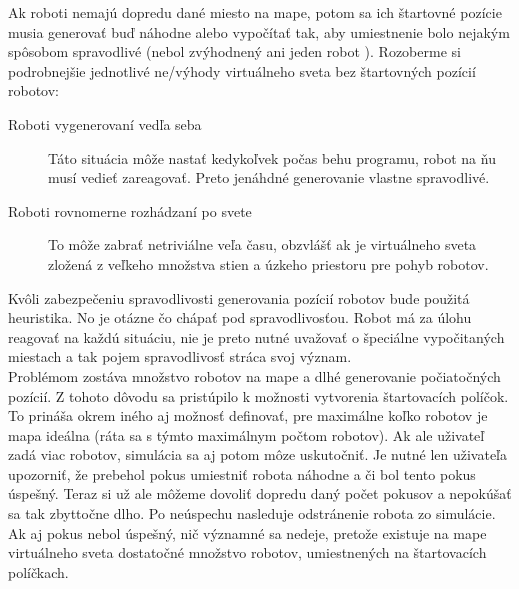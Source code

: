\begin{description}
\newline
Ak roboti nemajú dopredu dané miesto na mape, potom sa ich štartovné pozície musia generovať buď náhodne alebo vypočítať tak, aby umiestnenie bolo nejakým spôsobom spravodlivé (nebol zvýhodnený ani jeden robot ). Rozoberme si podrobnejšie jednotlivé ne/výhody virtuálneho sveta bez štartovných pozícií robotov:
\begin{description}
\item[Roboti vygenerovaní vedľa seba] \hfill \newline
Táto situácia môže nastať kedykoľvek počas behu programu, robot na ňu musí vedieť zareagovať. Preto jenáhdné generovanie vlastne spravodlivé.
\item[Roboti rovnomerne rozhádzaní po svete] \hfill \newline To môže zabrať netriviálne veľa času, obzvlášť ak je virtuálneho sveta zložená z veľkeho množstva stien a úzkeho priestoru pre pohyb robotov. %
\end{description}
\indent Kvôli zabezpečeniu spravodlivosti generovania pozícií robotov bude použitá heuristika. No je otázne čo chápať pod spravodlivosťou. Robot má za úlohu reagovať na každú situáciu, nie je preto nutné uvažovať o špeciálne vypočitaných miestach a tak pojem spravodlivosť stráca svoj význam.\\
Problémom zostáva množstvo robotov na mape a dlhé generovanie počiatočných pozícií. Z tohoto dôvodu sa pristúpilo k možnosti vytvorenia štartovacích políčok. To prináša okrem iného aj možnosť definovať, pre maximálne koľko robotov je mapa ideálna (ráta sa s týmto maximálnym počtom robotov). Ak ale uživateľ zadá viac robotov, simulácia sa aj potom môze uskutočniť. Je nutné len uživateľa upozorniť, že prebehol pokus umiestniť robota náhodne a či bol tento pokus úspešný. Teraz si už ale môžeme dovoliť dopredu daný počet pokusov a nepokúšať sa tak zbyttočne dlho. Po neúspechu nasleduje odstránenie robota zo simulácie. Ak aj pokus nebol úspešný, nič významné sa nedeje, pretože existuje na mape virtuálneho sveta dostatočné množstvo robotov, umiestnených na štartovacích políčkach.
\end{description}

